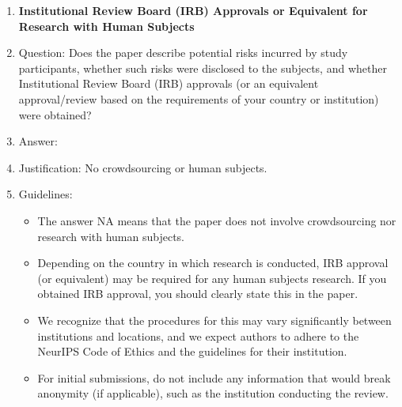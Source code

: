 \documentclass{article}
\begin{document}
{\begin{enumerate}
\item {\bf Institutional Review Board (IRB) Approvals or Equivalent for Research with Human Subjects}
    \item[] Question: Does the paper describe potential risks incurred by study participants, whether such risks were disclosed to the subjects, and whether Institutional Review Board (IRB) approvals (or an equivalent approval/review based on the requirements of your country or institution) were obtained?
    \item[] Answer: \answerNA{} %
    \item[] Justification: No crowdsourcing or human subjects.
    \item[] Guidelines:
    \begin{itemize}
        \item The answer NA means that the paper does not involve crowdsourcing nor research with human subjects.
        \item Depending on the country in which research is conducted, IRB approval (or equivalent) may be required for any human subjects research. If you obtained IRB approval, you should clearly state this in the paper.
        \item We recognize that the procedures for this may vary significantly between institutions and locations, and we expect authors to adhere to the NeurIPS Code of Ethics and the guidelines for their institution.
        \item For initial submissions, do not include any information that would break anonymity (if applicable), such as the institution conducting the review.
    \end{itemize}

\end{enumerate}

}
\end{document}
